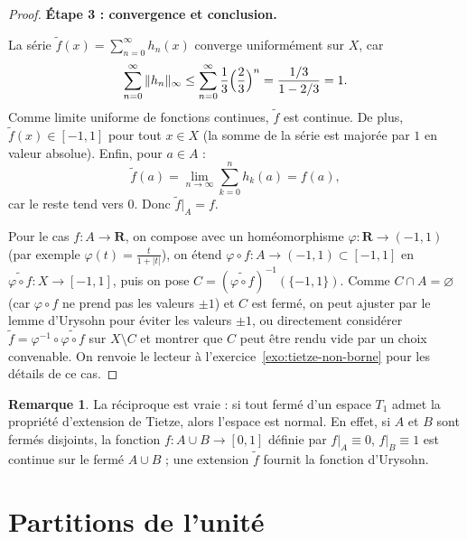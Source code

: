 \documentclass[12pt,a4paper,openany]{book}
\theoremstyle{definition}
\theoremstyle{cours}
\theoremstyle{coursnormal}
\newtheorem{remarque}[theoreme]{Remarque}
\begin{document}
\begin{proof}
\medskip\noindent
\textbf{Étape 3 : convergence et conclusion.}

La série $\tilde{f}(x)=\sum_{n=0}^{\infty}h_n(x)$ converge
uniformément sur $X$, car
\[
\sum_{n=0}^{\infty}\|h_n\|_\infty
  \le \sum_{n=0}^{\infty}\frac{1}{3}\Bigl(\frac{2}{3}\Bigr)^n
  = \frac{1/3}{1-2/3}=1.
\]
Comme limite uniforme de fonctions continues, $\tilde{f}$ est continue.
De plus, $\tilde{f}(x)\in[-1,1]$ pour tout $x\in X$ (la somme de la
série est majorée par $1$ en valeur absolue). Enfin, pour $a\in A$ :
\[
\tilde{f}(a)=\lim_{n\to\infty}\sum_{k=0}^n h_k(a)=f(a),
\]
car le reste tend vers $0$. Donc $\tilde{f}|_A=f$.

\medskip
Pour le cas $f\colon A\to\mathbf{R}$, on compose avec un homéomorphisme
$\varphi\colon\mathbf{R}\to(-1,1)$ (par exemple
$\varphi(t)=\frac{t}{1+|t|}$), on étend
$\varphi\circ f\colon A\to(-1,1)\subset[-1,1]$ en
$\widetilde{\varphi\circ f}\colon X\to[-1,1]$, puis on pose
$C=(\widetilde{\varphi\circ f})^{-1}(\{-1,1\})$. Comme $C\cap A
=\varnothing$ (car $\varphi\circ f$ ne prend pas les valeurs $\pm 1$)
et $C$ est fermé, on peut ajuster par le lemme d'Urysohn pour éviter
les valeurs $\pm 1$, ou directement considérer
$\tilde{f}=\varphi^{-1}\circ\widetilde{\varphi\circ f}$ sur
$X\setminus C$ et montrer que $C$ peut être rendu vide par un choix
convenable. On renvoie le lecteur à l'exercice~\ref{exo:tietze-non-borne}
pour les détails de ce cas.
\end{proof}

\begin{remarque}
\label{rem:tietze-reciproque}
La réciproque est vraie : si tout fermé d'un espace $T_1$ admet la
propriété d'extension de Tietze, alors l'espace est normal. En effet,
si $A$ et $B$ sont fermés disjoints, la fonction $f\colon A\cup B\to
[0,1]$ définie par $f|_A\equiv 0$, $f|_B\equiv 1$ est continue sur le
fermé $A\cup B$ ; une extension $\tilde{f}$ fournit la fonction d'Urysohn.
\end{remarque}

\section{Partitions de l'unité}
\label{sec:partitions-unite}
\end{document}
